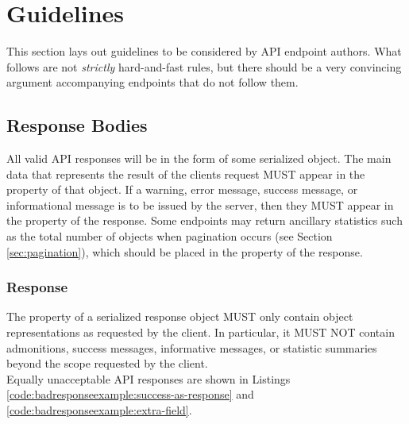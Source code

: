 %
%

\section{Guidelines}
This section lays out guidelines to be considered by API endpoint authors. What follows are not \emph{strictly} hard-and-fast rules, but
there should be a very convincing argument accompanying endpoints that do not follow them.

\subsection{Response Bodies}
All valid API responses will be in the form of some serialized object. The main
data that represents the result of the clients request MUST appear in the
 property of that object. If a warning, error message, success
message, or informational message is to be issued by the server, then they MUST
appear in the  property of the response. Some endpoints may return
ancillary statistics such as the total number of objects when pagination occurs
(see Section \ref{sec:pagination}), which should be placed in the 
property of the response.\\

\subsubsection{Response}
The  property of a serialized response object MUST only contain
object representations as requested by the client. In particular, it MUST NOT
contain admonitions, success messages, informative messages, or statistic
summaries beyond the scope requested by the client.\\
Equally unacceptable API responses are shown in Listings
\ref{code:badresponseexample:success-as-response} and
\ref{code:badresponseexample:extra-field}.

